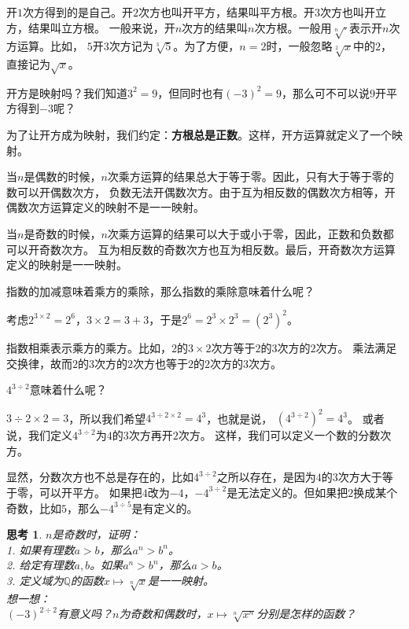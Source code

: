 \documentclass[12pt,UTF8]{ctexbook}
\newtheorem{sk}{思考}[section]
\begin{document}
开$1$次方得到的是自己。开$2$次方也叫开平方，结果叫平方根。开$3$次方也叫开立方，结果叫立方根。
一般来说，开$n$次方的结果叫$n$次方根。一般用$\sqrt[n]{\cdot}$表示开$n$次方运算。比如，
$5$开$3$次方记为$\sqrt[3]{5}$。为了方便，$n=2$时，一般忽略$\sqrt[2]{x}$中的$2$，直接记为$\sqrt{x}$。

开方是映射吗？我们知道$3^2 =9$，但同时也有$(-3)^2 =9$，那么可不可以说$9$开平方得到$-3$呢？

为了让开方成为映射，我们约定：\textbf{方根总是正数}。这样，开方运算就定义了一个映射。

当$n$是偶数的时候，$n$次乘方运算的结果总大于等于零。因此，只有大于等于零的数可以开偶数次方，
负数无法开偶数次方。由于互为相反数的偶数次方相等，开偶数次方运算定义的映射不是一一映射。

当$n$是奇数的时候，$n$次乘方运算的结果可以大于或小于零，因此，正数和负数都可以开奇数次方。
互为相反数的奇数次方也互为相反数。最后，开奇数次方运算定义的映射是一一映射。

指数的加减意味着乘方的乘除，那么指数的乘除意味着什么呢？

考虑$2^{3\times 2} = 2^6$，$3\times 2 = 3 + 3$，于是$2^6 = 2^3 \times 2^3 = \left(2^3\right)^2$。

指数相乘表示乘方的乘方。比如，$2$的$3\times 2$次方等于$2$的$3$次方的$2$次方。
乘法满足交换律，故而$2$的$3$次方的$2$次方也等于$2$的$2$次方的$3$次方。

$4^{3\div 2}$意味着什么呢？

$3\div 2 \times 2 = 3$，所以我们希望$4^{3\div 2 \times 2} = 4^3$，也就是说，
$\left(4^{3\div 2}\right)^2 = 4^3$。
或者说，我们定义$4^{3\div 2}$为$4$的$3$次方再开$2$次方。
这样，我们可以定义一个数的分数次方。

显然，分数次方也不总是存在的，比如$4^{3\div 2}$之所以存在，是因为$4$的$3$次方大于等于零，可以开平方。
如果把$4$改为$-4$，$-4^{3\div 2}$是无法定义的。但如果把$2$换成某个奇数，比如$5$，那么$-4^{3\div 5}$是有定义的。

\begin{sk}\label{sk:3-0-0}
    $n$是奇数时，证明：\\
    1. 如果有理数$a > b$，那么$a^n > b^n$。\\
    2. 给定有理数$a, b$。如果$a^n > b^n$，那么$a > b$。\\
    3. 定义域为$\mathbb{Q}$的函数$x \mapsto \sqrt[n]{x}$是一一映射。\\
    想一想：\\
    $(-3)^{2\div 2}$有意义吗？$n$为奇数和偶数时，$x \mapsto \sqrt[n]{x^n}$分别是怎样的函数？
\end{sk}
\end{document}
